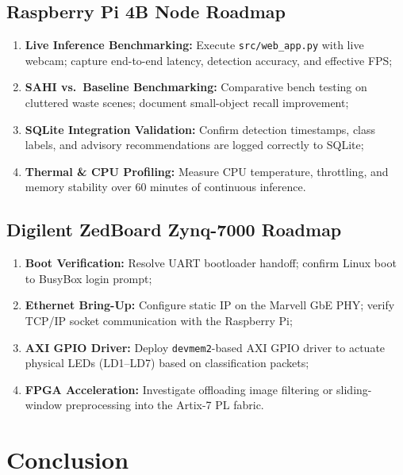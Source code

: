 \documentclass[12pt,a4paper]{article}
\begin{document}
\subsection{Raspberry Pi 4B Node Roadmap}

\begin{enumerate}[label=\textbf{R\arabic*.}]
  \item \textbf{Live Inference Benchmarking:} Execute \texttt{src/web\_app.py} with live
  webcam; capture end-to-end latency, detection accuracy, and effective FPS;
  \item \textbf{SAHI vs.\ Baseline Benchmarking:} Comparative bench testing on cluttered
  waste scenes; document small-object recall improvement;
  \item \textbf{SQLite Integration Validation:} Confirm detection timestamps, class labels,
  and advisory recommendations are logged correctly to SQLite;
  \item \textbf{Thermal \& CPU Profiling:} Measure CPU temperature, throttling, and memory
  stability over 60 minutes of continuous inference.
\end{enumerate}

\subsection{Digilent ZedBoard Zynq-7000 Roadmap}

\begin{enumerate}[label=\textbf{Z\arabic*.}]
  \item \textbf{Boot Verification:} Resolve UART bootloader handoff; confirm Linux boot
  to BusyBox login prompt;
  \item \textbf{Ethernet Bring-Up:} Configure static IP on the Marvell GbE PHY; verify
  TCP/IP socket communication with the Raspberry Pi;
  \item \textbf{AXI GPIO Driver:} Deploy \texttt{devmem2}-based AXI GPIO driver to actuate
  physical LEDs (LD1--LD7) based on classification packets;
  \item \textbf{FPGA Acceleration:} Investigate offloading image filtering or sliding-window
  preprocessing into the Artix-7 PL fabric.
\end{enumerate}

\clearpage

\section{Conclusion}
\end{document}

